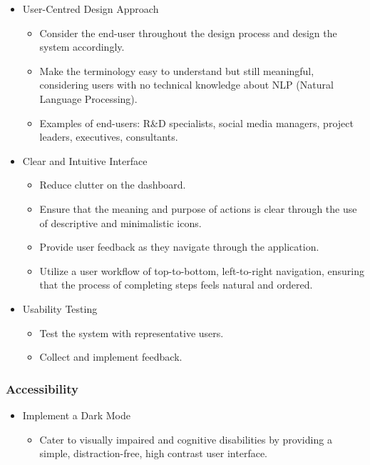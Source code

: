 \documentclass[12pt]{article}
\begin{document}
\begin{itemize}
  \item User-Centred Design Approach
        \begin{itemize}
          \item Consider the end-user throughout the design process and design the system accordingly.
          \item Make the terminology easy to understand but still meaningful, considering users with no technical knowledge about NLP (Natural Language Processing).
          \item Examples of end-users: R\&D specialists, social media managers, project leaders, executives, consultants.
        \end{itemize}
  \item Clear and Intuitive Interface
        \begin{itemize}
          \item Reduce clutter on the dashboard.
          \item Ensure that the meaning and purpose of actions is clear through the use of descriptive and minimalistic icons.
          \item Provide user feedback as they navigate through the application.
          \item Utilize a user workflow of top-to-bottom, left-to-right navigation, ensuring that the process of completing steps feels natural and ordered.
        \end{itemize}
  \item Usability Testing
        \begin{itemize}
          \item Test the system with representative users.
          \item Collect and implement feedback.
        \end{itemize}
\end{itemize}

\subsubsection*{Accessibility}

\begin{itemize}
  \item Implement a Dark Mode
        \begin{itemize}
          \item Cater to visually impaired and cognitive disabilities by providing a simple, distraction-free, high contrast user interface.
        \end{itemize}
\end{itemize}
\end{document}
